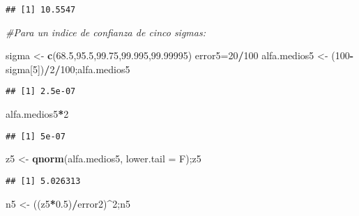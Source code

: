 \documentclass[
]{article}
\newenvironment{Shaded}{\begin{snugshade}}{\end{snugshade}}
\newcommand{\AttributeTok}[1]{\textcolor[rgb]{0.13,0.29,0.53}{#1}}
\newcommand{\CommentTok}[1]{\textcolor[rgb]{0.56,0.35,0.01}{\textit{#1}}}
\newcommand{\DecValTok}[1]{\textcolor[rgb]{0.00,0.00,0.81}{#1}}
\newcommand{\FloatTok}[1]{\textcolor[rgb]{0.00,0.00,0.81}{#1}}
\newcommand{\FunctionTok}[1]{\textcolor[rgb]{0.13,0.29,0.53}{\textbf{#1}}}
\newcommand{\NormalTok}[1]{#1}
\newcommand{\OtherTok}[1]{\textcolor[rgb]{0.56,0.35,0.01}{#1}}
\newcommand{\SpecialCharTok}[1]{\textcolor[rgb]{0.81,0.36,0.00}{\textbf{#1}}}
\begin{document}
\begin{verbatim}
## [1] 10.5547
\end{verbatim}

\begin{Shaded}
\begin{Highlighting}[]
\CommentTok{\#Para un indice de confianza de cinco sigmas:}

\NormalTok{sigma }\OtherTok{\textless{}{-}} \FunctionTok{c}\NormalTok{(}\FloatTok{68.5}\NormalTok{,}\FloatTok{95.5}\NormalTok{,}\FloatTok{99.75}\NormalTok{,}\FloatTok{99.995}\NormalTok{,}\FloatTok{99.99995}\NormalTok{)}
\NormalTok{error5}\OtherTok{=}\DecValTok{20}\SpecialCharTok{/}\DecValTok{100}
\NormalTok{alfa.medios5 }\OtherTok{\textless{}{-}}\NormalTok{ (}\DecValTok{100}\SpecialCharTok{{-}}\NormalTok{sigma[}\DecValTok{5}\NormalTok{])}\SpecialCharTok{/}\DecValTok{2}\SpecialCharTok{/}\DecValTok{100}\NormalTok{;alfa.medios5}
\end{Highlighting}
\end{Shaded}

\begin{verbatim}
## [1] 2.5e-07
\end{verbatim}

\begin{Shaded}
\begin{Highlighting}[]
\NormalTok{alfa.medios5}\SpecialCharTok{*}\DecValTok{2}
\end{Highlighting}
\end{Shaded}

\begin{verbatim}
## [1] 5e-07
\end{verbatim}

\begin{Shaded}
\begin{Highlighting}[]
\NormalTok{z5 }\OtherTok{\textless{}{-}} \FunctionTok{qnorm}\NormalTok{(alfa.medios5, }\AttributeTok{lower.tail =}\NormalTok{ F);z5}
\end{Highlighting}
\end{Shaded}

\begin{verbatim}
## [1] 5.026313
\end{verbatim}

\begin{Shaded}
\begin{Highlighting}[]
\NormalTok{n5 }\OtherTok{\textless{}{-}}\NormalTok{ ((z5}\SpecialCharTok{*}\FloatTok{0.5}\NormalTok{)}\SpecialCharTok{/}\NormalTok{error2)}\SpecialCharTok{\^{}}\DecValTok{2}\NormalTok{;n5}
\end{Highlighting}
\end{Shaded}
\end{document}
